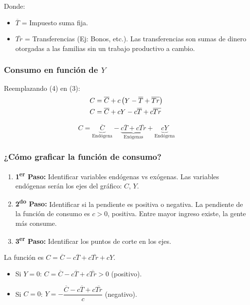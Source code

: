 \documentclass[11pt,a4paper]{article}
\newcommand{\barvar}[1]{\overline{#1}}
\begin{document}
Donde:
\begin{itemize}
    \item $\barvar{T}$ = Impuesto suma fija.
    \item $\barvar{Tr}$ = Transferencias (Ej: Bonos, etc.). Las transferencias son sumas de dinero otorgadas a las familias sin un trabajo productivo a cambio.
\end{itemize}

\subsubsection{Consumo en función de $Y$}

Reemplazando (4) en (3):
\begin{align}
    C &= \barvar{C} + c\left(Y - \barvar{T} + \barvar{Tr}\right) \notag \\
    C &= \barvar{C} + cY - c\barvar{T} + c\barvar{Tr} \notag
\end{align}

\begin{resultadobox}
\begin{equation}
    C = \underbrace{\barvar{C}}_{\text{Endógena}} - \underbrace{c\barvar{T} + c\barvar{Tr}}_{\text{Exógenas}} + \underbrace{cY}_{\text{Endógena}} \tag{5}
\end{equation}
\end{resultadobox}

\subsubsection{¿Cómo graficar la función de consumo?}

\begin{enumerate}
    \item \textbf{1\textsuperscript{er} Paso:} Identificar variables endógenas vs exógenas. Las variables endógenas serán los ejes del gráfico: $C$, $Y$.
    \item \textbf{2\textsuperscript{do} Paso:} Identificar si la pendiente es positiva o negativa. La pendiente de la función de consumo es $c > 0$, positiva. Entre mayor ingreso existe, la gente más consume.
    \item \textbf{3\textsuperscript{er} Paso:} Identificar los puntos de corte en los ejes.
\end{enumerate}

La función es $C = \barvar{C} - c\barvar{T} + c\barvar{Tr} + cY$.

\begin{itemize}
    \item Si $Y = 0$: $C = \barvar{C} - c\barvar{T} + c\barvar{Tr} > 0$ (positivo).
    \item Si $C = 0$: $Y = -\dfrac{\barvar{C} - c\barvar{T} + c\barvar{Tr}}{c}$ (negativo).
\end{itemize}
\end{document}
